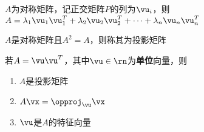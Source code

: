 \begin{theorem}[谱分解]
$A$为对称矩阵，记正交矩阵$P$的列为$\vu_i$，则$A=\lambda_1\vu_1\vu_1^T+\lambda_2\vu_2\vu_2^T+\cdots+\lambda_n\vu_n\vu_n^T$
\end{theorem}
\begin{definition}[投影矩阵]
$A$是对称矩阵且$A^2=A$，则称其为投影矩阵
\end{definition}
\begin{proposition}
若$A=\vu\vu^T$，其中$\vu\in\rn$为\textbf{单位}向量，则
\begin{enumerate}
	\itemsep -3pt
	\item $A$是投影矩阵
	\item $A\vx=\opproj_{\vu}\vx$
	\item $\vu$是$A$的特征向量
\end{enumerate}
\end{proposition}

